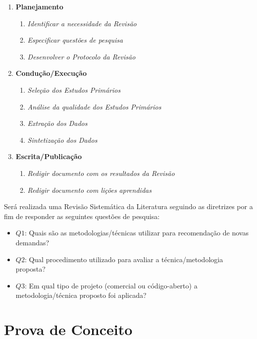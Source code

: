 \documentclass[msc,proposal,hidelot,hideabstract]{ppgccufmg} %
\begin{document}
\begin{enumerate}
  \item \textbf{Planejamento}
  \begin{enumerate}
    \item \textit{Identificar a necessidade da Revisão}
    \item \textit{Especificar questões de pesquisa}
    \item \textit{Desenvolver o Protocolo da Revisão}
  \end{enumerate}
  \item \textbf{Condução/Execução}
  \begin{enumerate}
    \item \textit{Seleção dos Estudos Primários}
    \item \textit{Análise da qualidade dos Estudos Primários}
     \item \textit{Extração dos Dados}
     \item \textit{Sintetização dos Dados}
   \end{enumerate}
  \item \textbf{Escrita/Publicação}
  \begin{enumerate}
    \item \textit{Redigir documento com os resultados da Revisão}
    \item \textit{Redigir documento com lições aprendidas}
  \end{enumerate}
\end{enumerate}

Será realizada uma Revisão Sistemática da Literatura seguindo as diretrizes por
\cite{keele2007guidelines} a fim de responder as seguintes questões de
pesquisa:


\begin{itemize}
  \item \textbf{$Q1$}: Quais são as metodologias/técnicas utilizar para
    recomendação de novas demandas?
  \item \textbf{$Q2$}: Qual procedimento utilizado para avaliar a
    técnica/metodologia proposta?
  \item \textbf{$Q3$}: Em qual tipo de projeto (comercial ou código-aberto) a
    metodologia/técnica proposto foi aplicada?
\end{itemize}


\section{Prova de Conceito}
\label{sec:prova-conceito}
\end{document}
